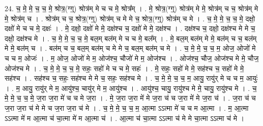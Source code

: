 \documentclass[17pt]{extarticle}
\begin{document}
24. च॒ मे॒ मे॒ च॒ च॒ मे॒ श्रोत्र॒(ग्ग्॒) श्रोत्र॑म् मे च च मे॒ श्रोत्र᳚म् । . मे॒ श्रोत्र॒(ग्ग्॒) श्रोत्र॑म् मे मे॒ श्रोत्र॑म् च च॒ श्रोत्र॑म् मे मे॒ श्रोत्र॑म् च । . श्रोत्र॑म् च च॒ श्रोत्र॒(ग्ग्॒) श्रोत्र॑म् च मे मे च॒ श्रोत्र॒(ग्ग्॒) श्रोत्र॑म् च मे । . च॒ मे॒ मे॒ च॒ च॒ मे॒ दक्षो॒ दक्षो॑ मे च च मे॒ दक्षः॑ । . मे॒ दक्षो॒ दक्षो॑ मे मे॒ दक्ष॑श्च च॒ दक्षो॑ मे मे॒ दक्ष॑श्च । . दक्ष॑श्च च॒ दक्षो॒ दक्ष॑श्च मे मे च॒ दक्षो॒ दक्ष॑श्च मे । . च॒ मे॒ मे॒ च॒ च॒ मे॒ बल॒म् बल॑म् मे च च मे॒ बल᳚म् । . मे॒ बल॒म् बल॑म् मे मे॒ बल॑म् च च॒ बल॑म् मे मे॒ बल॑म् च । . बल॑म् च च॒ बल॒म् बल॑म् च मे मे च॒ बल॒म् बल॑म् च मे । . च॒ मे॒ मे॒ च॒ च॒ म॒ ओज॒ ओजो॑ मे च च म॒ ओजः॑ । . म॒ ओज॒ ओजो॑ मे म॒ ओज॑श्च॒ चौजो॑ मे म॒ ओज॑श्च । . ओज॑श्च॒ चौज॒ ओज॑श्च मे मे॒ चौज॒ ओज॑श्च मे । . च॒ मे॒ मे॒ च॒ च॒ मे॒ सहः॒ सहो॑ मे च च मे॒ सहः॑ । . मे॒ सहः॒ सहो॑ मे मे॒ सह॑श्च च॒ सहो॑ मे मे॒ सह॑श्च । . सह॑श्च च॒ सहः॒ सह॑श्च मे मे च॒ सहः॒ सह॑श्च मे । . च॒ मे॒ मे॒ च॒ च॒ म॒ आयु॒ रायु॑र् मे च च म॒ आयुः॑ । . म॒ आयु॒ रायु॑र् मे म॒ आयु॑श्च॒ चायु॑र् मे म॒ आयु॑श्च । . आयु॑श्च॒ चायु॒ रायु॑श्च मे मे॒ चायु॒ रायु॑श्च मे । . च॒ मे॒ मे॒ च॒ च॒ मे॒ ज॒रा ज॒रा मे॑ च च मे ज॒रा । . मे॒ ज॒रा ज॒रा मे॑ मे ज॒रा च॑ च ज॒रा मे॑ मे ज॒रा च॑ । . ज॒रा च॑ च ज॒रा ज॒रा च॑ मे मे च ज॒रा ज॒रा च॑ मे । . च॒ मे॒ मे॒ च॒ च॒ म॒ आ॒त्मा ऽऽत्मा मे॑ च च म आ॒त्मा । . म॒ आ॒त्मा ऽऽत्मा मे॑ म आ॒त्मा च॑ चा॒त्मा मे॑ म आ॒त्मा च॑ । . आ॒त्मा च॑ चा॒त्मा ऽऽत्मा च॑ मे मे चा॒त्मा ऽऽत्मा च॑ मे । \newline
\end{document}
